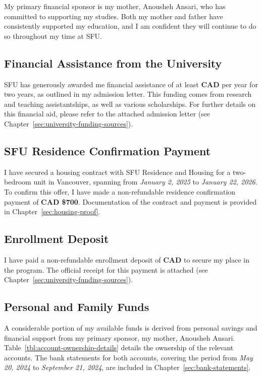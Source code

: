 \vspace{0.3cm}
My primary financial sponsor is my mother, Anousheh Ansari, who has committed to supporting my studies. Both my mother and father have consistently supported my education, and I am confident they will continue to do so throughout my time at SFU. 

\subsection{Financial Assistance from the University}\label{ssec:sfu-funding-info}
SFU has generously awarded me financial assistance of at least \textbf{CAD {\universityFunds}} per year for two years, as outlined in my admission letter. This funding comes from research and teaching assistantships, as well as various scholarships. For further details on this financial aid, please refer to the attached admission letter (see Chapter~\ref{sec:university-funding-sources}).

\subsection{SFU Residence Confirmation Payment}\label{ssec:residence-confirmation-payment}
I have secured a housing contract with SFU Residence and Housing for a two-bedroom unit in Vancouver, spanning from \textit{January 2, 2025} to \textit{January 22, 2026}. To confirm this offer, I have made a non-refundable residence confirmation payment of \textbf{CAD \$700}. Documentation of the contract and payment is provided in Chapter~\ref{sec:housing-proof}.

\subsection{Enrollment Deposit}\label{ssec:enrollment-deposit}
I have paid a non-refundable enrollment deposit of \textbf{CAD {\enrollmentDeposit}} to secure my place in the program. The official receipt for this payment is attached (see Chapter~\ref{sec:university-funding-sources}).

\clearpage

\subsection{Personal and Family Funds}\label{ssec:personal-family-funds}
A considerable portion of my available funds is derived from personal savings and financial support from my primary sponsor, my mother, Anousheh Ansari. Table~\ref{tbl:account-ownership-details} details the ownership of the relevant accounts. The bank statements for both accounts, covering the period from \textit{May 20, 2024} to \textit{September 21, 2024}, are included in Chapter~\ref{sec:bank-statements}.

